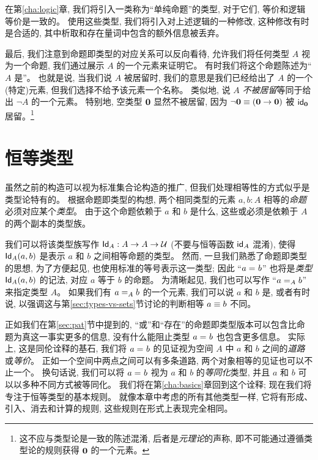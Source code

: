 在第\ref{cha:logic}章, 我们将引入一类称为``单纯命题''的类型, 对于它们, 等价和逻辑等价是一致的。
使用这些类型, 我们将引入对上述逻辑的一种修改, 这种修改有时是合适的, 其中析取和存在量词中包含的额外信息被丢弃。

最后, 我们注意到命题即类型的对应关系可以反向看待, 允许我们将任何类型 $A$ 视为一个命题, 我们通过展示 $A$ 的一个元素来证明它。
有时我们将这个命题陈述为``$A$ 是''。
%
%
也就是说, 当我们说 $A$ 被居留时, 我们的意思是我们已经给出了 $A$ 的一个(特定)元素, 但我们选择不给予该元素一个名称。
类似地, 说 $A$ \emph{不被居留}等同于给出 $\neg A$ 的一个元素。
特别地, 空类型 $\emptyt$ 显然不被居留, 因为 $\neg \emptyt \jdeq (\emptyt \to \emptyt)$ 被 $\idfunc[\emptyt]$ 居留。\footnote{这不应与类型论是一致的陈述混淆, 后者是\emph{元理论}的声称, 即不可能通过遵循类型论的规则获得 $\emptyt$ 的一个元素。}

%
%
%

\section{恒等类型}
\label{sec:identity-types}

%
%
%
%
虽然之前的构造可以视为标准集合论构造的推广, 但我们处理相等性的方式似乎是类型论特有的。
根据命题即类型的构想, 两个相同类型的元素 $a,b:A$ 相等的\emph{命题}必须对应某个\emph{类型}。
由于这个命题依赖于 $a$ 和 $b$ 是什么, 这些或必须是依赖于 $A$ 的两个副本的类型族。

我们可以将该类型族写作 $\idtypevar{A}:A\to A\to\type$ (不要与恒等函数 $\idfunc[A]$ 混淆), 使得 $\idtype[A]ab$ 是表示 $a$ 和 $b$ 之间相等命题的类型。
然而, 一旦我们熟悉了命题即类型的思想, 为了方便起见, 也使用标准的等号表示这一类型; 因此 ``$\id{a}{b}$'' 也将是\emph{类型} $\idtype[A]ab$ 的记法, 对应 $a$ 等于 $b$ 的命题。
为清晰起见, 我们也可以写作 ``$\id[A]{a}{b}$'' 来指定类型 $A$。
如果我们有 $\id[A]{a}{b}$ 的一个元素, 我们可以说 $a$ 和 $b$ 是, 或者有时说, 以强调这与第\ref{sec:types-vs-sets}节讨论的判断相等 $a\jdeq b$ 不同。
%
%

正如我们在第\ref{sec:pat}节中提到的, ``或''和``存在''的命题即类型版本可以包含比命题为真这一事实更多的信息, 没有什么能阻止类型 $\id{a}{b}$ 也包含更多信息。
实际上, 这是同伦诠释的基石, 我们将 $\id{a}{b}$ 的见证视为空间 $A$ 中 $a$ 和 $b$ 之间的\emph{道路}或\emph{等价}。
正如一个空间中两点之间可以有多条道路, 两个对象相等的见证也可以不止一个。
换句话说, 我们可以将 $\id{a}{b}$ 视为 $a$ 和 $b$ 的\emph{等同化}类型, 并且 $a$ 和 $b$ 可以以多种不同方式被等同化。
我们将在第\ref{cha:basics}章回到这个诠释; 现在我们将专注于恒等类型的基本规则。
就像本章中考虑的所有其他类型一样, 它将有形成、引入、消去和计算的规则, 这些规则在形式上表现完全相同。

